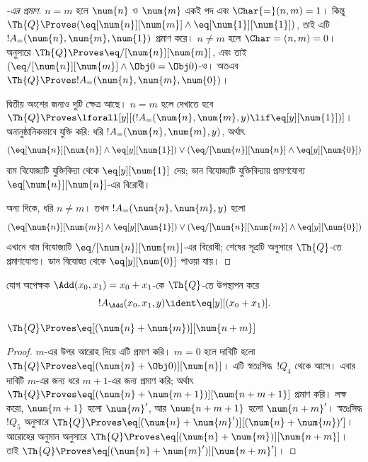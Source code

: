 \documentclass[../../../include/open-logic-section]{subfiles}
\begin{document}
\begin{proof}[-এর প্রমাণ]
$n = m$ হলে $\num{n}$ ও $\num{m}$ একই পদ এবং $\Char{=}(n, m) = 1$। কিন্তু
$\Th{Q} \Proves (\eq[\num{n}][\num{m}] \land
\eq[\num{1}][\num{1}])$, তাই এটি $!A_=(\num{n}, \num{m},
\num{1})$ প্রমাণ করে। $n \neq m$ হলে $\Char=(n, m) = 0$।
 অনুসারে $\Th{Q} \Proves
\eq/[\num{n}][\num{m}]$, এবং তাই
$(\eq/[\num{n}][\num{m}] \land \Obj 0 = \Obj 0)$-ও। অতএব
$\Th{Q} \Proves !A_=(\num{n}, \num{m}, \num{0})$।

দ্বিতীয় অংশের জন্যও দুটি ক্ষেত্র আছে। $n = m$ হলে দেখাতে হবে
$\Th{Q} \Proves \lforall[y][(!A_=(\num{n}, \num{m}, y)
  \lif \eq[y][\num{1}])]$। অনানুষ্ঠানিকভাবে যুক্তি করি: ধরি
$!A_=(\num{n}, \num{m}, y)$, অর্থাৎ
\[
(\eq[\num{n}][\num{n}] \land \eq[y][\num{1}]) \lor
(\eq/[\num{n}][\num{n}] \land \eq[y][\num{0}])
\]
বাম বিযোজ্যটি যুক্তিবিদ্যা থেকে $\eq[y][\num{1}]$ দেয়; ডান বিযোজ্যটি
যুক্তিবিদ্যায় প্রমাণযোগ্য $\eq[\num{n}][\num{n}]$-এর বিরোধী।

অন্য দিকে, ধরি $n \neq m$। তখন $!A_=(\num{n}, \num{m}, y)$ হলো
\[
(\eq[\num{n}][\num{m}] \land \eq[y][\num{1}]) \lor
(\eq/[\num{n}][\num{m}] \land \eq[y][\num{0}])
\]
এখানে বাম বিযোজ্যটি $\eq/[\num{n}][\num{m}]$-এর বিরোধী; শেষের সূত্রটি
 অনুসারে $\Th{Q}$-তে প্রমাণযোগ্য। ডান বিযোজ্য থেকে
$\eq[y][\num{0}]$ পাওয়া যায়।
\end{proof}

\begin{prop}
যোগ অপেক্ষক $\Add(x_0, x_1) = x_0+x_1$-কে $\Th{Q}$-তে উপস্থাপন করে
\[
  !A_{\Add}(x_0, x_1, y) \ident \eq[y][(x_0 + x_1)].
\]
\end{prop}

\begin{lem}
$\Th{Q} \Proves \eq[(\num{n} + \num{m})][\num{n+m}]$
\end{lem}

\begin{proof}
$m$-এর উপর আরোহ দিয়ে এটি প্রমাণ করি। $m = 0$ হলে দাবিটি হলো
$\Th{Q} \Proves \eq[(\num{n} + \Obj 0)][\num{n}]$। এটি স্বতঃসিদ্ধ~$!Q_4$
থেকে আসে। এবার দাবিটি $m$-এর জন্য ধরে $m+1$-এর জন্য প্রমাণ করি; অর্থাৎ
$\Th{Q} \Proves \eq[(\num{n} + \num{m+1})][\num{n+m+1}]$ প্রমাণ করি।
লক্ষ করো, $\num{m+1}$ হলো $\num{m}'$, আর $\num{n+m+1}$ হলো
$\num{n+m}'$। স্বতঃসিদ্ধ $!Q_5$ অনুসারে
$\Th{Q} \Proves \eq[(\num{n} + \num{m}')][(\num{n}+\num{m})']$। আরোহের
অনুমান অনুসারে $\Th{Q} \Proves
\eq[(\num{n} + \num{m})][\num{n+m}]$। তাই
$\Th{Q} \Proves \eq[(\num{n} + \num{m}')][\num{n+m}']$।
\end{proof}
\end{document}
